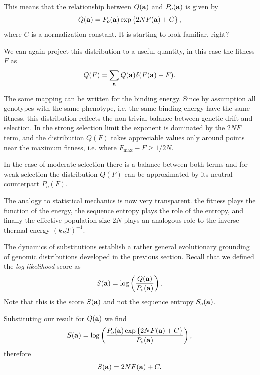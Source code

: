 This means that the relationship between $Q(\mathbf{a})$ and $P_o(\mathbf{a})$ is given
by
\begin{equation}
  Q(\mathbf{a}) = P_o(\mathbf{a}) \exp \left\{ 2 N F(\mathbf{a}) + C \right\},
\end{equation}
where $C$ is a normalization constant. It is starting to look familiar, right?

We can again project this distribution to a useful quantity, in this case the
fitness $F$ as
\begin{equation}
  Q(F) = \sum_{\mathbf{a}} Q(\mathbf{a}) \delta (F(\mathbf{a}) - F).
\end{equation}

The same mapping can be written for the binding energy. Since by assumption all
genotypes with the same phenotype, i.e. the same binding energy have the same
fitness, this distribution reflects the non-trivial balance between genetic
drift and selection. In the strong selection limit the exponent is dominated by
the $2 N F$ term, and the distribution $Q(F)$ takes appreciable values only
around points near the maximum fitness, i.e. where $F_{\max} - F \geq  1 / 2N$.

In the case of moderate selection there is a balance between both terms and for
weak selection the distribution $Q(F)$ can be approximated by its neutral
counterpart $P_o(F)$.

The analogy to statistical mechanics is now very transparent. the fitness plays
the function of the energy, the sequence entropy plays the role of the entropy,
and finally the effective population size $2N$ plays an analogous role to the
inverse thermal energy $(k_BT)^{-1}$.

The dynamics of substitutions establish a rather general evolutionary grounding
of genomic distributions developed in the previous section. Recall that we
defined the {\it log likelihood} score as
\begin{equation}
  S(\mathbf{a}) = \log \left( {Q(\mathbf{a}) \over P_o(\mathbf{a})} \right).
\end{equation}
Note that this is the score $S(\mathbf{a})$ and not the sequence entropy
$S_o(\mathbf{a})$. 

Substituting our result for $Q(\mathbf{a})$ we find
\begin{equation}
  S(\mathbf{a}) = \log \left( {P_o(\mathbf{a})
  \exp\left\{ 2 N F(\mathbf{a}) + C \right\} \over P_o(\mathbf{a})} \right),
\end{equation}
therefore
\begin{equation}
  S(\mathbf{a}) = 2 N F(\mathbf{a}) + C.
\end{equation}

